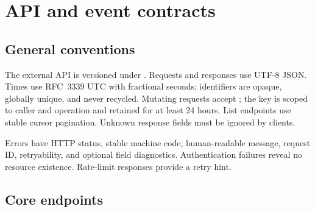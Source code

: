 \section{API and event contracts}

\subsection{General conventions}

The external API is versioned under . Requests and responses use UTF-8 JSON.
Times use RFC~3339 UTC with fractional seconds; identifiers are opaque, globally unique,
and never recycled. Mutating requests accept ; the key is scoped
to caller and operation and retained for at least 24 hours. List endpoints use stable
cursor pagination. Unknown response fields must be ignored by clients.

Errors have HTTP status, stable machine code, human-readable message, request ID,
retryability, and optional field diagnostics. Authentication failures reveal no
resource existence. Rate-limit responses provide a retry hint.

\subsection{Core endpoints}

